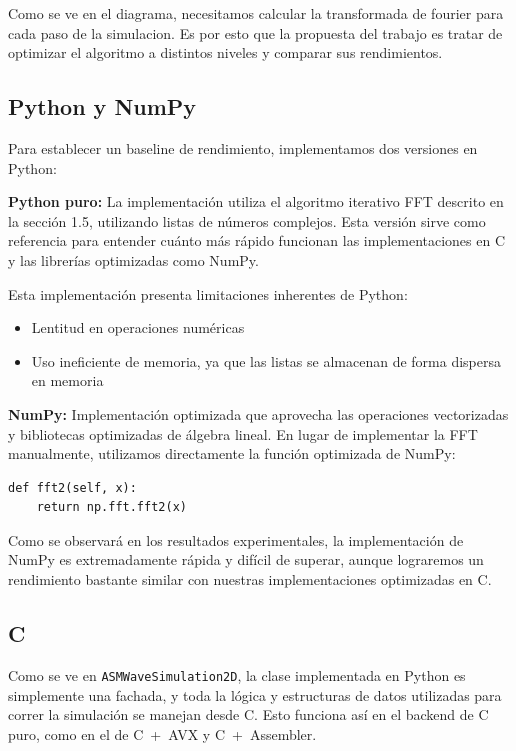 \documentclass[a4paper]{article}
\begin{document}
Como se ve en el diagrama, necesitamos calcular la transformada de fourier para cada paso de la simulacion. Es por esto que la
propuesta del trabajo es tratar de optimizar el algoritmo a distintos niveles y comparar sus rendimientos.

\subsection{Python y NumPy}

Para establecer un baseline de rendimiento, implementamos dos versiones en Python:

\textbf{Python puro:} La implementación utiliza el algoritmo iterativo FFT descrito en la sección 1.5, utilizando listas de números complejos.
Esta versión sirve como referencia para entender cuánto más rápido funcionan las implementaciones en C y las librerías optimizadas como NumPy.

Esta implementación presenta limitaciones inherentes de Python:
\begin{itemize}
    \item Lentitud en operaciones numéricas
    \item Uso ineficiente de memoria, ya que las listas se almacenan de forma dispersa en memoria
\end{itemize}

\textbf{NumPy:} Implementación optimizada que aprovecha las operaciones vectorizadas y bibliotecas optimizadas de álgebra lineal. En lugar
de implementar la FFT manualmente, utilizamos directamente la función optimizada de NumPy:

\begin{verbatim}
def fft2(self, x):
    return np.fft.fft2(x)
\end{verbatim}

Como se observará en los resultados experimentales, la implementación de NumPy es extremadamente rápida y difícil de superar, aunque lograremos
un rendimiento bastante similar con nuestras implementaciones optimizadas en C.

\subsection{C}
Como se ve en \texttt{ASMWaveSimulation2D}, la clase implementada en Python es simplemente una fachada, y toda la lógica y estructuras de datos utilizadas para correr la simulación se manejan desde C. Esto funciona así en el backend de C puro, como en el de C~+~AVX y C~+~Assembler.
\end{document}
